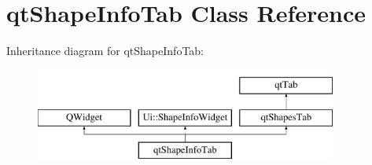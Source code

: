 \hypertarget{classqt_shape_info_tab}{}\section{qt\+Shape\+Info\+Tab Class Reference}
\label{classqt_shape_info_tab}
Inheritance diagram for qt\+Shape\+Info\+Tab\+:\begin{figure}[H]
\begin{center}
\leavevmode
\includegraphics[height=3.000000cm]{classqt_shape_info_tab}
\end{center}
\end{figure}
